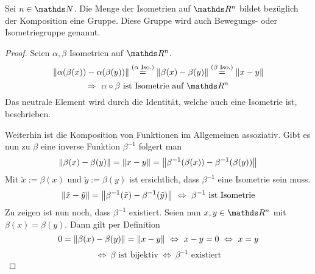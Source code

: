 		\begin{lemma}
			Sei $n\in\SN$. Die Menge der Isometrien auf $\SR^n$ bildet bezüglich der Komposition eine Gruppe.
			Diese Gruppe wird auch Bewegungs- oder Isometriegruppe genannt.
		\end{lemma}
		\begin{proof}
			Seien $\alpha,\beta$ Isometrien auf $\SR^n$.
			\[
				\left\| \alpha(\beta(x))-\alpha(\beta(y)) \right\| \stackrel{\text{($\alpha$ Iso.)}}{=} \left\| \beta(x) - \beta(y) \right\| \stackrel{\text{($\beta$ Iso.)}}{=} \left\| x-y \right\|
			\]
			\[
				\Rightarrow \ \alpha\circ\beta \text{ ist Isometrie auf } \SR^n
			\]
			Das neutrale Element wird durch die Identität, welche auch eine Isometrie ist, beschrieben.
			

			Weiterhin ist die Komposition von Funktionen im Allgemeinen assoziativ.
			Gibt es nun zu $\beta$ eine inverse Funktion $\beta^{-1}$ folgert man
			\[
				\left\| \beta(x)-\beta(y) \right\| = \left\| x-y \right\| = \left\| \beta^{-1}(\beta(x)) - \beta^{-1}(\beta(y)) \right\|
			\]
			Mit $\tilde{x}:=\beta(x)$ und $\tilde{y}:=\beta(y)$ ist ersichtlich, dass $\beta^{-1}$ eine Isometrie sein muss.
			\[
				\norm{\tilde{x}-\tilde{y}} = \norm{\beta^{-1}(\tilde{x})-\beta^{-1}(\tilde{y})} \ \Leftrightarrow \ \beta^{-1} \text{ ist Isometrie}
			\]
			Zu zeigen ist nun noch, dass $\beta^{-1}$ existiert.
			Seien nun $x,y\in\SR^n$ mit $\beta(x)=\beta(y)$.
			Dann gilt per Definition
			\[
				0 = \norm{\beta(x)-\beta(y)} = \norm{x-y} \ \Leftrightarrow \ x-y = 0 \ \Leftrightarrow \ x = y 
			\]
			\[
				\Leftrightarrow \ \beta \text{ ist bijektiv} \ \Leftrightarrow \ \beta^{-1} \text{ existiert}
			\]
		\end{proof}

